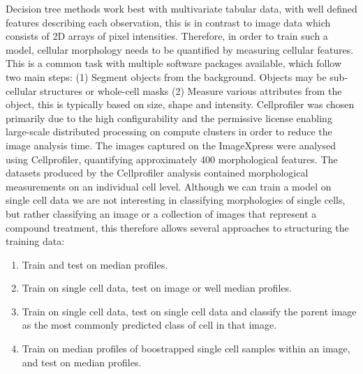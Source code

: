 \documentclass[a4paper,11pt,twoside,openright]{scrbook}
\begin{document}
Decision tree methods work best with multivariate tabular data, with well defined features describing each observation, this is in contrast to image data which consists of 2D arrays of pixel intensities.
Therefore, in order to train such a model, cellular morphology needs to be quantified by measuring cellular features.
This is a common task with multiple software packages available, which follow two main steps: (1) Segment objects from the background. Objects may be sub-cellular structures or whole-cell masks (2) Measure various attributes from the object, this is typically based on size, shape and intensity.
Cellprofiler \cite{Carpenter2006} was chosen primarily due to the high configurability and the permissive license enabling large-scale distributed processing on compute clusters in order to reduce the image analysis time.
The images captured on the ImageXpress were analysed using Cellprofiler, quantifying approximately 400 morphological features.
The datasets produced by the Cellprofiler analysis contained morphological measurements on an individual cell level.
Although we can train a model on single cell data we are not interesting in classifying morphologies of single cells, but rather classifying an image or a collection of images that represent a compound treatment, this therefore allows several approaches to structuring the training data:

\begin{enumerate}
    \item Train and test on median profiles.
    \item Train on single cell data, test on image or well median profiles.
    \item Train on single cell data, test on single cell data and classify the parent image as the most commonly predicted class of cell in that image.
    \item Train on median profiles of boostrapped single cell samples within an image, and test on median profiles.
\end{enumerate}


\end{document}
